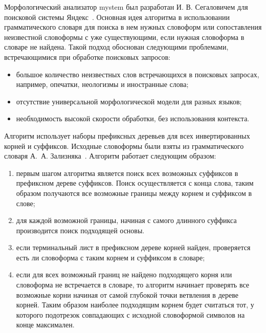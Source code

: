 Морфологический анализатор mystem был разработан И. В. Сегаловичем для поисковой системы Яндекс~\cite{segalovich2003fast}. Основная идея алгоритма в использовании грамматического словаря  для поиска в нем нужных словоформ или сопоставления неизвестной словоформы с уже существующими, если нужная словоформа в словаре не найдена. Такой подход обоснован следующими проблемами, встречающимися при обработке поисковых запросов:
\begin{itemize}
	\item большое количество неизвестных слов встречающихся в поисковых запросах, например, опечатки, неологизмы и иностранные слова;
	\item отсутствие универсальной морфологической модели для разных языков;
	\item необходимость высокой скорости обработки, без использования контекста.
\end{itemize}

Алгоритм использует наборы префиксных деревьев для всех инвертированных корней и суффиксов. Исходные словоформы были взяты из грамматического словаря А.~А. Зализняка~\cite{Zalizniak1980}. Алгоритм работает следующим образом:
\begin{enumerate}
	\item первым шагом алгоритма является поиск всех возможных суффиксов в префиксном дереве суффиксов. Поиск осуществляется с конца слова, таким образом получаются все возможные границы между корнем и суффиксом в слове;
	\item для каждой возможной границы, начиная с самого длинного суффикса производится поиск подходящей основы.
	\item если терминальный лист в префиксном дереве корней найден, проверяется есть ли словоформа с таким корнем и суффиксом в словаре;
	\item если для всех возможный границ не найдено подходящего корня или словоформа не встречается в словаре, то алгоритм начинает проверять все возможные корни начиная от самой глубокой точки ветвления в дереве корней. Таким образом наиболее подходящим корнем будет считаться тот, у которого подотрезок совпадающих с исходной словоформой символов на конце максимален. 
\end{enumerate}

